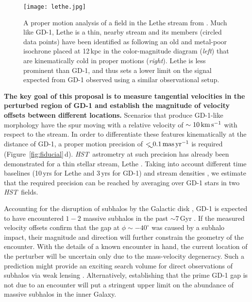 \documentclass[12pt]{article}
\newcommand{\hst}{\textsl{HST}}
\begin{document}
\begin{figure}
\begin{center}
\texttt{[image: lethe.jpg]}
\end{center}
\caption{
A proper motion analysis of a field in the Lethe stream from \textcite{sohn2016}.
Much like GD-1, Lethe is a thin, nearby stream and its members (circled data points) have been identified as following an old and metal-poor isochrone placed at 12\,kpc in the color-magnitude diagram (\emph{left}) that are kinematically cold in proper motions (\emph{right}).
Lethe is less prominent than GD-1, and thus sets a lower limit on the signal expected from GD-1 observed using a similar observational setup.
}
\label{fig:lethe}
\end{figure}

{\bf The key goal of this proposal is to measure tangential velocities in the perturbed region of GD-1 and establish the magnitude of velocity offsets between different locations.}
Scenarios that produce GD-1-like morphology have the spur moving with a relative velocity of $\sim10\,\rm km\,s^{-1}$ with respect to the stream.
In order to differentiate these features kinematically at the distance of GD-1, a proper motion precision of $\lesssim0.1\,\rm mas\,yr^{-1}$ is required (Figure~\ref{fig:fiducial}\,d).
\hst\ astrometry at such precision has already been demonstrated for a thin stellar stream, Lethe \parencite[Figure~\ref{fig:lethe}, $\sigma_\mu\sim0.05\,\rm mas\,yr^{-1}$;][]{sohn2016}.
Taking into account different time baselines (10\,yrs for Lethe and 3\,yrs for GD-1) and stream densities \parencite[GD-1 is $\sim$ twice as dense;][]{grillmair2006, grillmair2009}, we estimate that the required precision can be reached by averaging over GD-1 stars in two \hst\ fields.

Accounting for the disruption of subhalos by the Galactic disk \parencite{gk2017}, GD-1 is expected to have encountered $1-2$ massive subhalos in the past $\sim7$\,Gyr \parencite{erkal2016}.
If the measured velocity offsets confirm that the gap at $\phi\sim-40^\circ$ was caused by a subhalo impact, their magnitude and direction will further constrain the geometry of the encounter.
With the details of a known encounter in hand, the current location of the perturber will be uncertain only due to the mass-velocity degeneracy.
Such a prediction might provide an exciting search volume for direct observations of subhalos via weak lensing \parencite{vtilburg2018}.
Alternatively, establishing that the prime GD-1 gap is not due to an encounter will put a stringent upper limit on the abundance of massive subhalos in the inner Galaxy.
\end{document}
